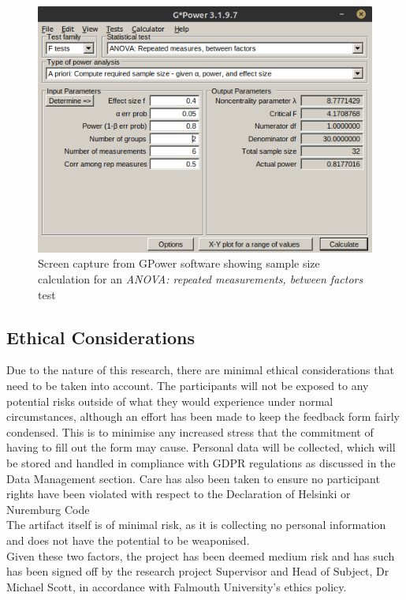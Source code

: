 \documentclass[journal]{IEEEtran}
\begin{document}
\begin{figure}[h!]
    \includegraphics[width=\columnwidth]{Images/ANOVA_2.png}
    \caption{Screen capture from GPower software showing sample size calculation for an \textit{ANOVA: repeated measurements, between factors} test}
    \label{ANOVArepeatedbetween}
\end{figure}

\subsection{Ethical Considerations}
Due to the nature of this research, there are minimal ethical considerations that need to be taken into account. The participants will not be exposed to any potential risks outside of what they would experience under normal circumstances, although an effort has been made to keep the feedback form fairly condensed. This is to minimise any increased stress that the commitment of having to fill out the form may cause. Personal data will be collected, which will be stored and handled in compliance with GDPR regulations as discussed in the Data Management section. Care has also been taken to ensure no participant rights have been violated with respect to the Declaration of Helsinki\cite{goodyear2007declaration} or Nuremburg Code\cite{code1949nuremberg}\\
The artifact itself is of minimal risk, as it is collecting no personal information and does not have the potential to be weaponised. \\
Given these two factors, the project has been deemed medium risk and has such has been signed off by the research project Supervisor and Head of Subject, Dr Michael Scott, in accordance with Falmouth University's ethics policy\cite{falethicspolicy}.
\end{document}
